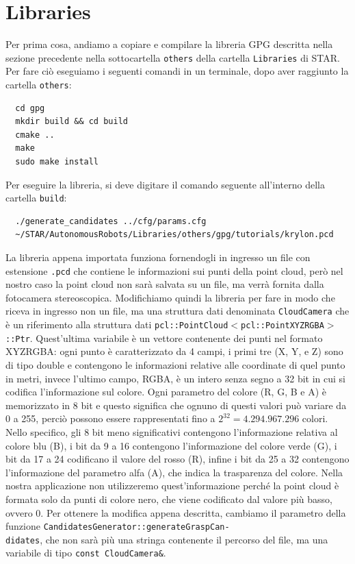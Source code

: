 \documentclass{report}
\begin{document}
\section{Libraries}
Per prima cosa, andiamo a copiare e compilare la libreria GPG descritta nella sezione precedente nella sottocartella \texttt{others} della cartella \texttt{Libraries} di STAR. Per fare ciò eseguiamo i seguenti comandi in un terminale, dopo aver raggiunto la cartella \texttt{others}:
\begin{verbatim}
  cd gpg
  mkdir build && cd build
  cmake ..
  make
  sudo make install
\end{verbatim}
Per eseguire la libreria, si deve digitare il comando seguente all'interno della cartella \texttt{build}:
\begin{verbatim}
  ./generate_candidates ../cfg/params.cfg 
  ~/STAR/AutonomousRobots/Libraries/others/gpg/tutorials/krylon.pcd
\end{verbatim}
La libreria appena importata funziona fornendogli in ingresso un file con estensione \texttt{.pcd} che contiene le informazioni sui punti della point cloud, però nel nostro caso la point cloud non sarà salvata su un file, ma verrà fornita dalla fotocamera stereoscopica. Modifichiamo quindi la libreria per fare in modo che riceva in ingresso non un file, ma una struttura dati denominata \texttt{CloudCamera} che è un riferimento alla struttura dati \texttt{pcl::PointCloud$<$pcl::PointXYZRGBA$>$::Ptr}. Quest'ultima variabile è un vettore contenente dei punti nel formato XYZRGBA: ogni punto è caratterizzato da 4 campi, i primi tre (X, Y, e Z) sono di tipo double e contengono le informazioni relative alle coordinate di quel punto in metri, invece l'ultimo campo, RGBA, è un intero senza segno a 32 bit in cui si codifica l'informazione sul colore. Ogni parametro del colore (R, G, B e A) è memorizzato in 8 bit e questo significa che ognuno di questi valori può variare da 0 a 255, perciò possono essere rappresentati fino a $\displaystyle{2^{32}=4.294.967.296}$ colori. Nello specifico, gli 8 bit meno significativi contengono l'informazione relativa al colore blu (B), i bit da 9 a 16 contengono l'informazione del colore verde (G), i bit da 17 a 24 codificano il valore del rosso (R), infine i bit da 25 a 32 contengono l'informazione del parametro alfa (A), che indica la trasparenza del colore. Nella nostra applicazione non utilizzeremo quest'informazione perché la point cloud è formata solo da punti di colore nero, che viene codificato dal valore più basso, ovvero 0. Per ottenere la modifica appena descritta, cambiamo il parametro della funzione \texttt{CandidatesGenerator::generateGraspCan-}\\\texttt{didates}, che non sarà più una stringa contenente il percorso del file, ma una variabile di tipo \texttt{const CloudCamera\&}. \par
\end{document}
